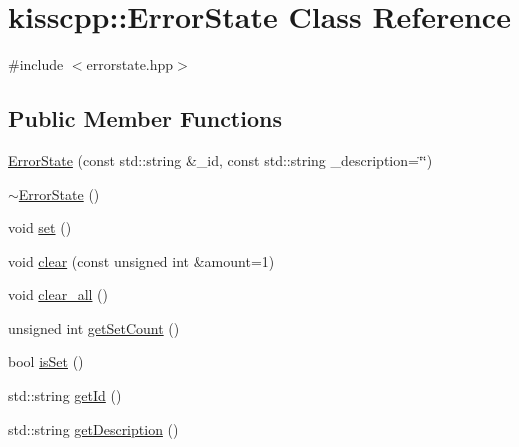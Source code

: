 \hypertarget{classkisscpp_1_1_error_state}{\section{kisscpp\-:\-:Error\-State Class Reference}
\label{classkisscpp_1_1_error_state}
}


{\ttfamily \#include $<$errorstate.\-hpp$>$}

\subsection*{Public Member Functions}
\begin{DoxyCompactItemize}
\item 
\hyperlink{classkisscpp_1_1_error_state_ab6136e6d85bb86357c348bf1fe86d33c}{Error\-State} (const std\-::string \&\-\_\-id, const std\-::string \-\_\-description=\char`\"{}\char`\"{})
\item 
\hyperlink{classkisscpp_1_1_error_state_a75f55fa61878bb008abd861012b88662}{$\sim$\-Error\-State} ()
\item 
void \hyperlink{classkisscpp_1_1_error_state_adba9283ecd7976c57ef48d438da86778}{set} ()
\item 
void \hyperlink{classkisscpp_1_1_error_state_a2d6939dda90115b7f93a03595296e49b}{clear} (const unsigned int \&amount=1)
\item 
void \hyperlink{classkisscpp_1_1_error_state_aa9da790733f2f6963a5b6ca1167d137b}{clear\-\_\-all} ()
\item 
unsigned int \hyperlink{classkisscpp_1_1_error_state_a211a4d0740010a7aa7c78b8514bc6969}{get\-Set\-Count} ()
\item 
bool \hyperlink{classkisscpp_1_1_error_state_a79c9043eb6c04a10e7c4b86888697ce8}{is\-Set} ()
\item 
std\-::string \hyperlink{classkisscpp_1_1_error_state_aa5a968379c634aac795876be977c8420}{get\-Id} ()
\item 
std\-::string \hyperlink{classkisscpp_1_1_error_state_a98341b8b71401981fadb66779d540a45}{get\-Description} ()
\end{DoxyCompactItemize}


